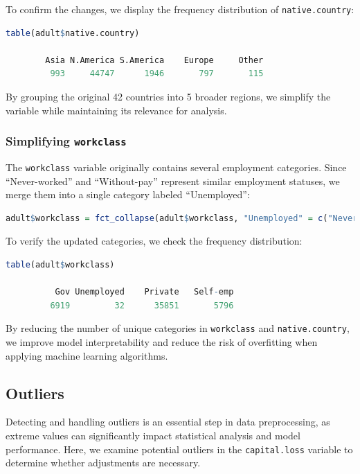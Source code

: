 \documentclass[
]{book}
\newcommand{\passthrough}[1]{#1}
\theoremstyle{definition}
\theoremstyle{definition}
\theoremstyle{definition}
\theoremstyle{definition}
\theoremstyle{remark}
\begin{document}
To confirm the changes, we display the frequency distribution of \passthrough{\lstinline!native.country!}:

\begin{lstlisting}[language=R]
table(adult$native.country)
   
        Asia N.America S.America    Europe     Other 
         993     44747      1946       797       115
\end{lstlisting}

By grouping the original 42 countries into 5 broader regions, we simplify the variable while maintaining its relevance for analysis.

\subsubsection*{\texorpdfstring{Simplifying \texttt{workclass}}{Simplifying workclass}}\label{simplifying-workclass}

The \passthrough{\lstinline!workclass!} variable originally contains several employment categories. Since ``Never-worked'' and ``Without-pay'' represent similar employment statuses, we merge them into a single category labeled ``Unemployed'':

\begin{lstlisting}[language=R]
adult$workclass = fct_collapse(adult$workclass, "Unemployed" = c("Never-worked", "Without-pay"))
\end{lstlisting}

To verify the updated categories, we check the frequency distribution:

\begin{lstlisting}[language=R]
table(adult$workclass)
   
          Gov Unemployed    Private   Self-emp 
         6919         32      35851       5796
\end{lstlisting}

By reducing the number of unique categories in \passthrough{\lstinline!workclass!} and \passthrough{\lstinline!native.country!}, we improve model interpretability and reduce the risk of overfitting when applying machine learning algorithms.

\subsection{Outliers}\label{outliers}

Detecting and handling outliers is an essential step in data preprocessing, as extreme values can significantly impact statistical analysis and model performance. Here, we examine potential outliers in the \passthrough{\lstinline!capital.loss!} variable to determine whether adjustments are necessary.
\end{document}
